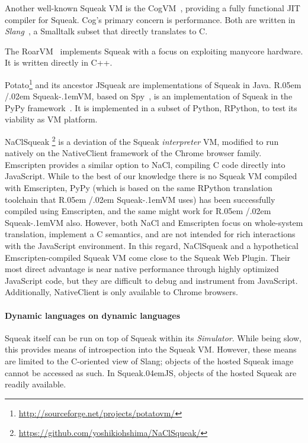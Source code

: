 \documentclass[natbib]{sigplanconf}
\newcommand*\SqueakJS{Squeak\texorpdfstring{\kern.04em}{}JS\xspace}
\newcommand*\JS{JavaScript\xspace}
\newcommand*\RSqueakVM{R\kern.05em /\kern.02em Squeak\kern-.1emVM\xspace}
\begin{document}
Another well-known Squeak \ac{VM} is the
Cog\ac{VM}~\cite{Miranda2011:The-Cog-Smalltalk-Virtual-Machine:},
providing a fully functional \ac{JIT} compiler for Squeak. Cog's
primary concern is performance.  Both are written in
\emph{Slang}~\cite{GuzdialRose02}, a Smalltalk subset that directly
translates to C.

The RoarVM~\cite{Ungar+2009:Hosting-an-object-heap} implements Squeak
with a focus on exploiting manycore hardware. It is written directly
in C++.

Potato\footnote{\url{http://sourceforge.net/projects/potatovm/}} and
its ancestor {JSqueak} are implementations of Squeak in Java.
\RSqueakVM, based on
Spy~\cite{Bolz+2008:Back-to-the-Future-in-One-Week}, is an
implementation of Squeak in the PyPy framework~\cite{Wassermann13}. It
is implemented in a subset of Python, RPython, to test its viability
as \ac{VM} platform.

NaClSqueak%
\footnote{\url{https://github.com/yoshikiohshima/NaClSqueak/}} is a
deviation of the Squeak \emph{interpreter} \ac{VM}, modified to run
natively on the NativeClient framework of the Chrome browser family.
Emscripten provides a similar option to NaCl, compiling C code
directly into \JS. While to the best of our knowledge there is no
Squeak \ac{VM} compiled with Emscripten, PyPy (which is based on the
same RPython translation toolchain that \RSqueakVM uses) has been
successfully compiled using Emscripten, and the same might work for
\RSqueakVM also. However, both NaCl and Emscripten focus on
whole-system translation, implement a C semantics, and are not
intended for rich interactions with the \JS environment. In this
regard, NaClSqueak and a hypothetical Emscripten-compiled Squeak
\ac{VM} come close to the Squeak Web Plugin. Their most direct
advantage is near native performance through highly optimized \JS
code, but they are difficult to debug and instrument from \JS.
Additionally, NativeClient is only available to Chrome browsers.

\paragraph{Dynamic languages on dynamic languages}
\label{sec:dynam-lang-impl}

Squeak itself can be run on top of Squeak within its
\emph{Simulator}. While being slow, this provides means of
introspection into the Squeak \ac{VM}. However, these means are
limited to the C-oriented view of Slang; objects of the hosted Squeak
image cannot be accessed as such. In \SqueakJS, objects of the hosted
Squeak are readily available.
\end{document}
